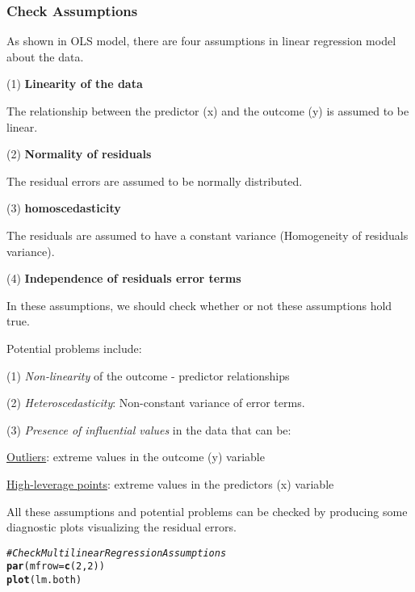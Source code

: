 \documentclass{article}\usepackage[]{graphicx}\usepackage[]{xcolor}
\makeatletter
\newcommand{\hlnum}[1]{\textcolor[rgb]{0.686,0.059,0.569}{#1}}%
\newcommand{\hlcom}[1]{\textcolor[rgb]{0.678,0.584,0.686}{\textit{#1}}}%
\newcommand{\hlstd}[1]{\textcolor[rgb]{0.345,0.345,0.345}{#1}}%
\newcommand{\hlkwc}[1]{\textcolor[rgb]{0.333,0.667,0.333}{#1}}%
\newcommand{\hlkwd}[1]{\textcolor[rgb]{0.737,0.353,0.396}{\textbf{#1}}}%
\newenvironment{kframe}{%
 \def\at@end@of@kframe{}%
 \ifinner\ifhmode%
  \def\at@end@of@kframe{\end{minipage}}%
  \begin{minipage}{\columnwidth}%
 \fi\fi%
 \def\FrameCommand##1{\hskip\@totalleftmargin \hskip-\fboxsep
 \colorbox{shadecolor}{##1}\hskip-\fboxsep
     \hskip-\linewidth \hskip-\@totalleftmargin \hskip\columnwidth}%
 \MakeFramed {\advance\hsize-\width
   \@totalleftmargin\z@ \linewidth\hsize
   \@setminipage}}%
 {\par\unskip\endMakeFramed%
 \at@end@of@kframe}
\newenvironment{knitrout}{}{} %
\makeatother
\begin{document}
\subsubsection*{Check Assumptions}
As shown in OLS model, there are four assumptions in linear regression model about the data.

(1) \textbf{Linearity of the data}

The relationship between the predictor (x) and the outcome (y) is assumed to be linear.

(2) \textbf{Normality of residuals}

The residual errors are assumed to be normally distributed.

(3) \textbf{homoscedasticity}

The residuals are assumed to have a constant variance (Homogeneity of residuals variance).

(4) \textbf{Independence of residuals error terms}

In these assumptions, we should check whether or not these assumptions hold true. 

Potential problems include:

(1) \emph{Non-linearity} of the outcome - predictor relationships

(2) \emph{Heteroscedasticity}: Non-constant variance of error terms.

(3) \emph{Presence of influential values} in the data that can be:

\underline{Outliers}: extreme values in the outcome (y) variable

\underline{High-leverage points}: extreme values in the predictors (x) variable

All these assumptions and potential problems can be checked by producing some diagnostic plots visualizing the residual errors.

\begin{knitrout}
\color{fgcolor}\begin{kframe}
\begin{alltt}
\hlcom{# Check Multilinear Regression Assumptions}
\hlkwd{par}\hlstd{(}\hlkwc{mfrow} \hlstd{=} \hlkwd{c}\hlstd{(}\hlnum{2}\hlstd{,} \hlnum{2}\hlstd{))}
\hlkwd{plot}\hlstd{(lm.both)}
\end{alltt}


{\ttfamily\noindent\bfseries\color{errorcolor}{\#\# Error in h(simpleError(msg, call)): error in evaluating the argument 'x' in selecting a method for function 'plot': object 'lm.both' not found}}\end{kframe}
\end{knitrout}
\end{document}

